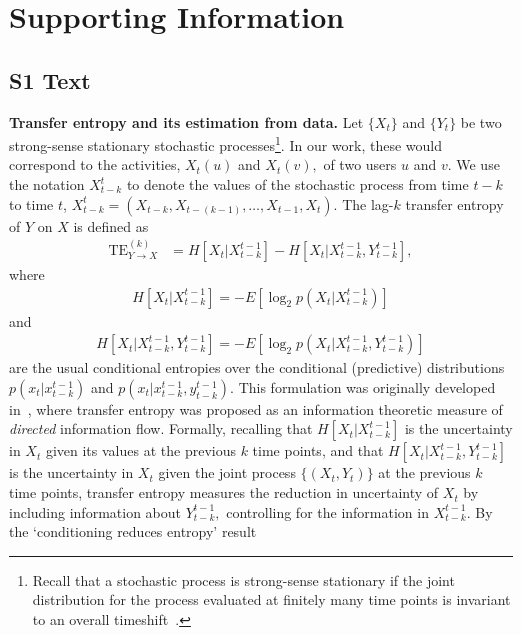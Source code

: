 \documentclass[10pt,letterpaper]{article}
\begin{document}
\section*{Supporting Information}


\subsection*{S1 Text}
\label{S1_Text}
{\bf Transfer entropy and its estimation from data.} Let $\{X_{t}\}$ and $\{ Y_{t}\}$ be two strong-sense stationary stochastic processes\footnote{Recall that a stochastic process is strong-sense stationary if the joint distribution for the process evaluated at finitely many time points is invariant to an overall timeshift~\cite{grimmett2001probability}.}. In our work, these would correspond to the activities, $X_{t}(u)$ and $X_{t}(v),$ of two users $u$ and $v$. We use the notation $X_{t-k}^{t}$ to denote the values of the stochastic process from time $t-k$ to time $t$, $X_{t-k}^{t} = (X_{t-k}, X_{t-(k-1)}, \ldots, X_{t - 1}, X_{t})$. The lag-$k$ transfer entropy~\cite{schreiber2000measuring} of $Y$ on $X$ is defined as 
\begin{align}
	\text{TE}_{Y \to X}^{(k)} &= H\left[X_{t} | X_{t-k}^{t-1}\right] - H\left[X_{t} | X_{t-k}^{t-1}, Y_{t-k}^{t-1}\right], \label{Eqn-TE}
\end{align}
where
\begin{align}
	H\left[X_{t} | X_{t-k}^{t-1}\right] = - E\left[ \log_{2} p(X_{t} | X_{t-k}^{t-1}) \right]
\end{align}
and 
\begin{align}
	H\left[X_{t} | X_{t-k}^{t-1}, Y_{t-k}^{t-1}\right] = - E\left[ \log_{2} p(X_{t} | X_{t-k}^{t-1}, Y_{t-k}^{t-1}) \right]
\end{align}
are the usual conditional entropies over the conditional (predictive) distributions $p(x_{t} | x_{t-k}^{t-1})$ and $p(x_{t} | x_{t-k}^{t-1}, y_{t-k}^{t-1})$. This formulation was originally developed in~\cite{schreiber2000measuring}, where transfer entropy was proposed as an information theoretic measure of \emph{directed} information flow. Formally, recalling that $H\left[X_{t} | X_{t-k}^{t-1}\right]$ is the uncertainty in $X_{t}$ given its values at the previous $k$ time points, and that $H\left[X_{t} | X_{t-k}^{t-1}, Y_{t-k}^{t-1}\right]$ is the uncertainty in $X_{t}$ given the joint process $\{(X_{t}, Y_{t})\}$ at the previous $k$ time points, transfer entropy measures the reduction in uncertainty of $X_{t}$ by including information about $Y_{t-k}^{t-1},$ controlling for the information in $X_{t - k}^{t-1}$. By the `conditioning reduces entropy' result~\cite{cover2012elements}
\end{document}
